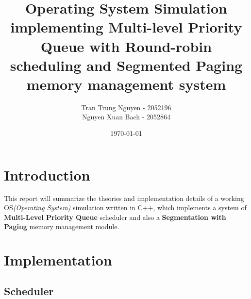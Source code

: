 \documentclass[]{article}
\title{Operating System Simulation implementing Multi-level Priority Queue with Round-robin scheduling and Segmented Paging memory management system}
\author{Tran Trung Nguyen - 2052196 \\
Nguyen Xuan Bach - 2052864}
\date{\today}
\begin{document}
\maketitle

\newpage
\tableofcontents
\newpage

\section{Introduction}
This report will summarize the theories and implementation details of a working OS\textit{(Operating System)} simulation written in C++, which implements a system of \textbf{Multi-Level Priority Queue} scheduler and also a \textbf{Segmentation with Paging} memory management module.
\section{Implementation}
\subsection{Scheduler}
\end{document}
